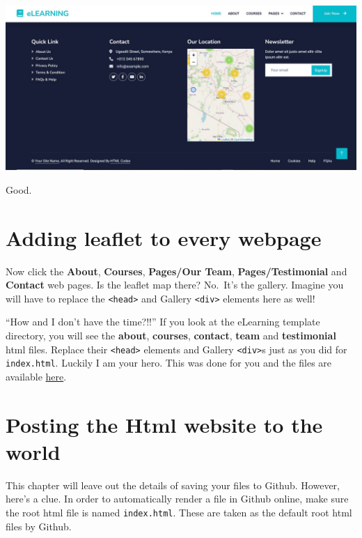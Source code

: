 \documentclass[
]{book}
\begin{document}
\includegraphics[width=26.28in]{../images/location_elearning}

Good.

\hypertarget{adding-leaflet-to-every-webpage}{%
\section{Adding leaflet to every webpage}\label{adding-leaflet-to-every-webpage}}

Now click the \textbf{About}, \textbf{Courses}, \textbf{Pages/Our Team}, \textbf{Pages/Testimonial} and \textbf{Contact} web pages. Is the leaflet map there? No.~It's the gallery. Imagine you will have to replace the \texttt{\textless{}head\textgreater{}} and Gallery \texttt{\textless{}div\textgreater{}} elements here as well!

``How and I don't have the time?!!'' If you look at the eLearning template directory, you will see the \textbf{about}, \textbf{courses}, \textbf{contact}, \textbf{team} and \textbf{testimonial} html files. Replace their \texttt{\textless{}head\textgreater{}} elements and Gallery \texttt{\textless{}div\textgreater{}}s just as you did for \texttt{index.html}. Luckily I am your hero. This was done for you and the files are available \href{https://github.com/sammigachuhi/elearning_template_demo.git}{here}.

\hypertarget{posting-the-html-website-to-the-world}{%
\section{Posting the Html website to the world}\label{posting-the-html-website-to-the-world}}

This chapter will leave out the details of saving your files to Github. However, here's a clue. In order to automatically render a file in Github online, make sure the root html file is named \texttt{index.html}. These are taken as the default root html files by Github.
\end{document}
